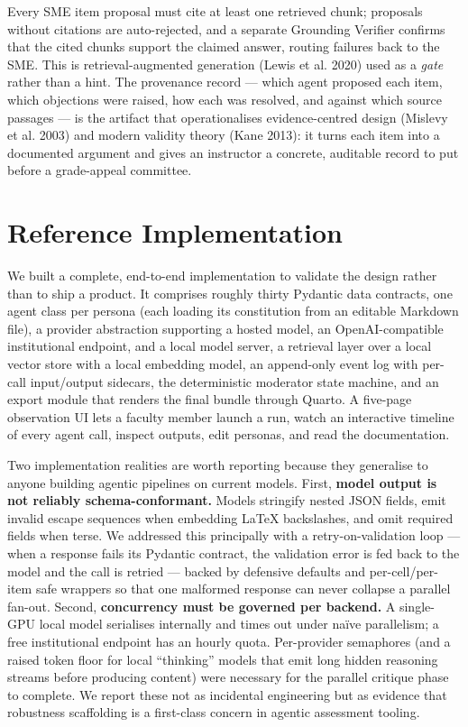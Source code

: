 \documentclass[
  11pt,
  letterpaper,
]{article}
\begin{document}
Every SME item proposal must cite at least one retrieved chunk;
proposals without citations are auto-rejected, and a separate Grounding
Verifier confirms that the cited chunks support the claimed answer,
routing failures back to the SME. This is retrieval-augmented generation
(Lewis et al. 2020) used as a \emph{gate} rather than a hint. The
provenance record --- which agent proposed each item, which objections
were raised, how each was resolved, and against which source passages
--- is the artifact that operationalises evidence-centred design
(Mislevy et al. 2003) and modern validity theory (Kane 2013): it turns
each item into a documented argument and gives an instructor a concrete,
auditable record to put before a grade-appeal committee.

\section{Reference Implementation}\label{reference-implementation}

We built a complete, end-to-end implementation to validate the design
rather than to ship a product. It comprises roughly thirty Pydantic data
contracts, one agent class per persona (each loading its constitution
from an editable Markdown file), a provider abstraction supporting a
hosted model, an OpenAI-compatible institutional endpoint, and a local
model server, a retrieval layer over a local vector store with a local
embedding model, an append-only event log with per-call input/output
sidecars, the deterministic moderator state machine, and an export
module that renders the final bundle through Quarto. A five-page
observation UI lets a faculty member launch a run, watch an interactive
timeline of every agent call, inspect outputs, edit personas, and read
the documentation.

Two implementation realities are worth reporting because they generalise
to anyone building agentic pipelines on current models. First,
\textbf{model output is not reliably schema-conformant.} Models
stringify nested JSON fields, emit invalid escape sequences when
embedding LaTeX backslashes, and omit required fields when terse. We
addressed this principally with a retry-on-validation loop --- when a
response fails its Pydantic contract, the validation error is fed back
to the model and the call is retried --- backed by defensive defaults
and per-cell/per-item safe wrappers so that one malformed response can
never collapse a parallel fan-out. Second, \textbf{concurrency must be
governed per backend.} A single-GPU local model serialises internally
and times out under naïve parallelism; a free institutional endpoint has
an hourly quota. Per-provider semaphores (and a raised token floor for
local ``thinking'' models that emit long hidden reasoning streams before
producing content) were necessary for the parallel critique phase to
complete. We report these not as incidental engineering but as evidence
that robustness scaffolding is a first-class concern in agentic
assessment tooling.
\end{document}
